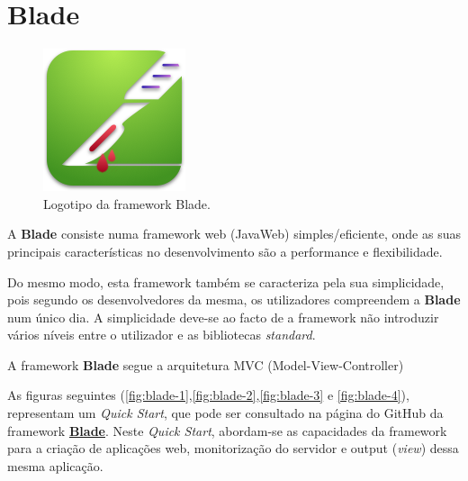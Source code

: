 \section{Blade}
\label{sec:blade}

\begin{figure}[H]
    \centering
    \includegraphics[scale=0.4]{images/blade.png}
    \caption{Logotipo da framework Blade.}
    \label{fig:blade}
\end{figure}

\hspace{5mm} A \textbf{Blade} consiste numa framework web (JavaWeb) simples/eficiente, onde as suas principais características no desenvolvimento são a performance e flexibilidade. 

\hspace{5mm} Do mesmo modo, esta framework também se caracteriza pela sua simplicidade, pois segundo os desenvolvedores da mesma, os utilizadores compreendem a \textbf{Blade} num único dia. A simplicidade deve-se ao facto de a framework não introduzir vários níveis entre o utilizador e as bibliotecas \textit{standard}.

\hspace{5mm} A framework \textbf{Blade} segue a arquitetura MVC (Model-View-Controller)

\hspace{5mm} As figuras seguintes (\ref{fig:blade-1},\ref{fig:blade-2},\ref{fig:blade-3} e \ref{fig:blade-4}), representam um \textit{Quick Start}, que pode ser consultado na página do GitHub da framework \textcolor{blue}{\textbf{\href{https://github.com/lets-blade/blade}{Blade}}}. Neste \textit{Quick Start}, abordam-se as capacidades da framework para a criação de aplicações web, monitorização do servidor e output (\textit{view}) dessa mesma aplicação.


